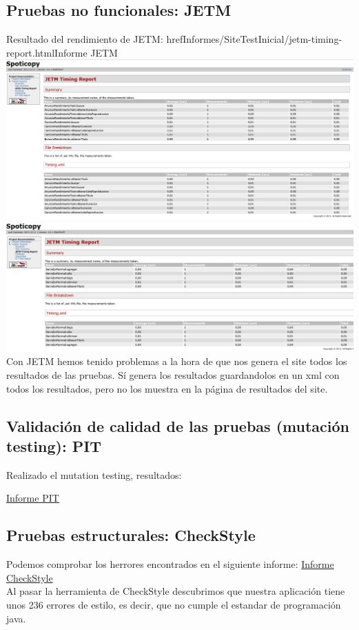 \documentclass[12pt, a4paper, titlepage]{article}
\begin{document}
	\subsection{Pruebas no funcionales: JETM}
	Resultado del rendimiento de JETM:
	href{Informes/SiteTestInicial/jetm-timing-report.html}{Informe JETM} \\

	\includegraphics[width=16cm]{Imagenes/JETM1.png} \\
	\includegraphics[width=16cm]{Imagenes/JETM2.png} \\
	Con JETM hemos tenido problemas  a la hora de que nos genera el site todos los resultados de las pruebas. Sí genera los resultados guardandolos en un xml con todos los resultados, pero no los muestra en la página de resultados del site.
	\subsection{Validación de calidad de las pruebas (mutación testing): PIT}
	Realizado el mutation testing, resultados:
	
	\href{Informes/PIT1/index.html}{Informe PIT} \\
	
	\subsection{Pruebas estructurales: CheckStyle}
	Podemos comprobar los herrores encontrados en el siguiente informe: \href{Informes/SiteTestInicial/checkstyle.html}{Informe CheckStyle} \\
	Al pasar la herramienta de CheckStyle descubrimos que nuestra aplicación tiene unos 236 errores de estilo, es decir, que no cumple el estandar de programación java.
	
\end{document}
